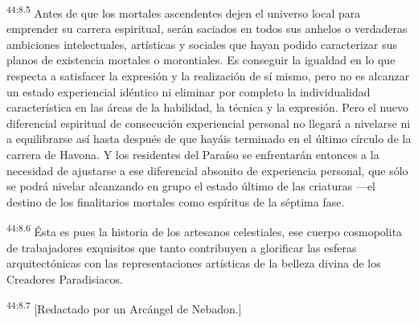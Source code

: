 \par
\textsuperscript{44:8.5} Antes de que los mortales ascendentes dejen el universo local para emprender su carrera espiritual, serán saciados en todos sus anhelos o verdaderas ambiciones intelectuales, artísticas y sociales que hayan podido caracterizar sus planos de existencia mortales o morontiales. Es conseguir la igualdad en lo que respecta a satisfacer la expresión y la realización de sí mismo, pero no es alcanzar un estado experiencial idéntico ni eliminar por completo la individualidad característica en las áreas de la habilidad, la técnica y la expresión. Pero el nuevo diferencial espiritual de consecución experiencial personal no llegará a nivelarse ni a equilibrarse así hasta después de que hayáis terminado en el último círculo de la carrera de Havona. Y los residentes del Paraíso se enfrentarán entonces a la necesidad de ajustarse a ese diferencial absonito de experiencia personal, que sólo se podrá nivelar alcanzando en grupo el estado último de las criaturas ---el destino de los finalitarios mortales como espíritus de la séptima fase.

\par
\textsuperscript{44:8.6} Ésta es pues la historia de los artesanos celestiales, ese cuerpo cosmopolita de trabajadores exquisitos que tanto contribuyen a glorificar las esferas arquitectónicas con las representaciones artísticas de la belleza divina de los Creadores Paradisiacos.

\par
\textsuperscript{44:8.7} [Redactado por un Arcángel de Nebadon.]